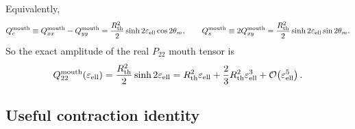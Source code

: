 \documentclass[11pt]{article}
\theoremstyle{plain}
\theoremstyle{definition}
\theoremstyle{remark}
\newcommand{\Ptwotwo}{P_{22}}
\newcommand{\Rth}{R_{\mathrm{th}}}
\newcommand{\epsell}{\varepsilon_{\mathrm{ell}}}
\newcommand{\thmouth}{\theta_m}
\newcommand{\Order}[1]{\mathcal{O}\!\left(#1\right)}
\begin{document}
Equivalently,
\begin{equation}
Q_c^{\rm mouth}
\equiv
Q_{xx}^{\rm mouth}-Q_{yy}^{\rm mouth}
=
\frac{\Rth^2}{2}\sinh 2\epsell\cos 2\thmouth,
\qquad
Q_s^{\rm mouth}
\equiv
2Q_{xy}^{\rm mouth}
=
\frac{\Rth^2}{2}\sinh 2\epsell\sin 2\thmouth.
\label{eq:ellipse-mouth-real-components}
\end{equation}
So the exact amplitude of the real \(\Ptwotwo\) mouth tensor is
\begin{equation}
Q_{22}^{\rm mouth}(\epsell)=\frac{\Rth^2}{2}\sinh 2\epsell
=\Rth^2\epsell+\frac{2}{3}\Rth^2\epsell^3+\Order{\epsell^5}.
\label{eq:ellipse-mouth-amplitude-expansion}
\end{equation}

\subsection{Useful contraction identity}\label{subsec:ellipse-contraction}
\end{document}
